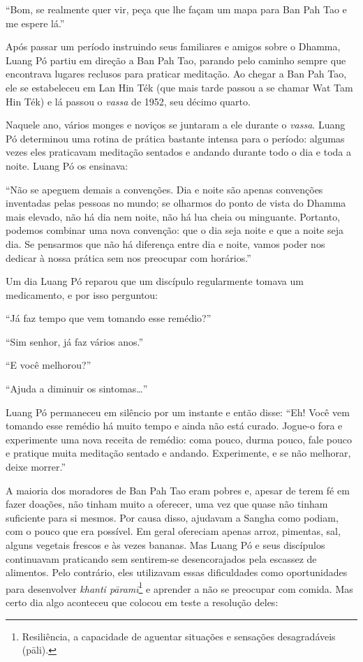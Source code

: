 ``Bom, se realmente quer vir, peça que lhe façam um mapa para Ban Pah
Tao e me espere lá.''

Após passar um período instruindo seus familiares e amigos sobre o
Dhamma, Luang Pó partiu em direção a Ban Pah Tao, parando pelo caminho
sempre que encontrava lugares reclusos para praticar meditação. Ao
chegar a Ban Pah Tao, ele se estabeleceu em Lan Hin Ték (que mais tarde
passou a se chamar Wat Tam Hin Ték) e lá passou o \emph{vassa} de 1952,
seu décimo quarto.

Naquele ano, vários monges e noviços se juntaram a ele durante o
\emph{vassa}. Luang Pó determinou uma rotina de prática bastante intensa
para o período: algumas vezes eles praticavam meditação sentados e
andando durante todo o dia e toda a noite. Luang Pó os ensinava:

``Não se apeguem demais a convenções. Dia e noite são apenas convenções
inventadas pelas pessoas no mundo; se olharmos do ponto de vista do
Dhamma mais elevado, não há dia nem noite, não há lua cheia ou
minguante. Portanto, podemos combinar uma nova convenção: que o dia seja
noite e que a noite seja dia. Se pensarmos que não há diferença entre
dia e noite, vamos poder nos dedicar à nossa prática sem nos preocupar
com horários.''

Um dia Luang Pó reparou que um discípulo regularmente tomava um
medicamento, e por isso perguntou:

``Já faz tempo que vem tomando esse remédio?''

``Sim senhor, já faz vários anos.''

``E você melhorou?''

``Ajuda a diminuir os sintomas\ldots{}''

Luang Pó permaneceu em silêncio por um instante e então disse: ``Eh!
Você vem tomando esse remédio há muito tempo e ainda não está curado.
Jogue-o fora e experimente uma nova receita de remédio: coma pouco,
durma pouco, fale pouco e pratique muita meditação sentado e andando.
Experimente, e se não melhorar, deixe morrer.''

A maioria dos moradores de Ban Pah Tao eram pobres e, apesar de terem fé
em fazer doações, não tinham muito a oferecer, uma vez que quase não
tinham suficiente para si mesmos. Por causa disso, ajudavam a Sangha
como podiam, com o pouco que era possível. Em geral ofereciam apenas
arroz, pimentas, sal, alguns vegetais frescos e às vezes bananas. Mas
Luang Pó e seus discípulos continuavam praticando sem sentirem-se
desencorajados pela escassez de alimentos. Pelo contrário, eles
utilizavam essas dificuldades como oportunidades para desenvolver
\emph{khanti pāramī}\footnote{Resiliência, a capacidade de aguentar
  situações e sensações desagradáveis (pāli).} e aprender a não se
preocupar com comida. Mas certo dia algo aconteceu que colocou em teste
a resolução deles:

